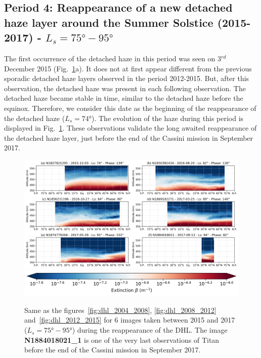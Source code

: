 \subsection{Period 4: Reappearance of a new detached haze layer around the Summer Solstice (2015-2017) - $L_s=\ang{75}-\ang{95}$}

The first occurrence of the detached haze in this period was seen on 3$^{rd}$ December 2015
(Fig.~\ref{fig:dhl_2015_2017}a). It
does not at first appear different from the previous sporadic detached haze layers observed in the period 2012-2015. But, after
this observation, the detached haze was present in each following observation. The detached haze became stable in time,
similar to the detached haze before the equinox. Therefore, we consider this date as the beginning of the
reappearance of the detached haze ($L_s=\ang{74}$). The evolution of the haze during this period is displayed in
Fig.~\ref{fig:dhl_2015_2017}. These observations validate the long awaited reappearance of the detached haze layer,
just before the end of the Cassini mission in September 2017.

\begin{figure}[!ht]
    \centering
    \includegraphics[width=\textwidth]{Fig/Lat_beta-2015_2017.png}
    \includegraphics[width=.5\textwidth]{Fig/Extinction_colorbar.png}\vspace{-.3cm}
    \caption{Same as the figures~\ref{fig:dhl_2004_2008}, \ref{fig:dhl_2008_2012}
    and~\ref{fig:dhl_2012_2015} for 6 images taken between 2015 and 2017
    ($L_s=\ang{75}-\ang{95}$) during the reappearance of the DHL.
    The image \textbf{N1884018021\_1} is one of the very last observations of Titan before
    the end of the Cassini mission in September 2017.}
    \label{fig:dhl_2015_2017}
\end{figure}

